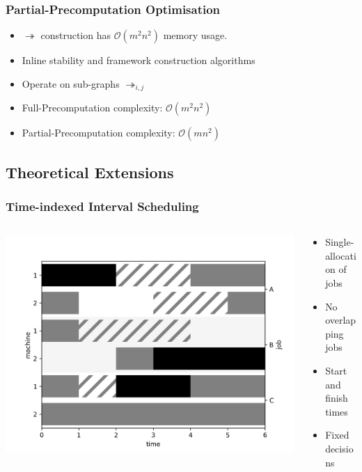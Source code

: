 \documentclass[11pt]{beamer}
\begin{document}
	\begin{frame}
		\frametitle{Partial-Precomputation Optimisation}
		\begin{itemize}
			\item $\twoheadrightarrow$ construction has $\mathcal{O}(m^2n^2)$ memory usage.
			\item Inline stability and framework construction algorithms
			\item Operate on sub-graphs $\twoheadrightarrow_{i,j}$
		\end{itemize}
		\vspace{\baselineskip}
		\begin{itemize}
			\item Full-Precomputation complexity: $\mathcal{O}(m^2n^2)$
			\item Partial-Precomputation complexity: $\mathcal{O}(mn^2)$
		\end{itemize}
	\end{frame}	
	\subsection{Theoretical Extensions}

	\begin{frame}
		\frametitle{Time-indexed Interval Scheduling}
		\begin{columns}
			\begin{column}{0.5\textwidth}
				\begin{center}
					\includegraphics[width=\textwidth]{figures/interval_schedule.png}
				\end{center}
			\end{column}
			\begin{column}{0.5\textwidth}
				\begin{itemize}
					\item Single-allocation of jobs
					\item No overlapping jobs	
					\item Start and finish times
					\item Fixed decisions
				\end{itemize}
			\end{column}
		\end{columns}
	\end{frame}
\end{document}
